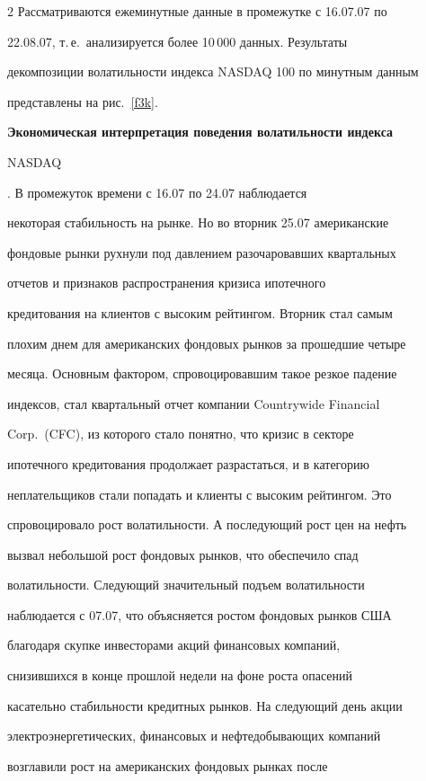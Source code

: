 \begin{multicols}{2}
Рассматриваются ежеминутные данные в промежутке с 16.07.07 по


22.08.07, т.\,е.\ анализируется более 10\,000 данных. Результаты


декомпозиции волатильности индекса NASDAQ 100 по минутным данным


представлены на рис.~\ref{f3k}.





{\bf Экономическая интерпретация поведения волатильности индекса


NASDAQ}. В промежуток вре\-мени с 16.07 по 24.07 наблюдается


некоторая стабильность на рынке. Но во вторник 25.07 американские


фондовые рынки рухнули под давлением разочаровавших квартальных


отчетов и признаков распространения кризиса ипотечного


кредитования на клиентов с высоким рейтингом. Вторник стал самым


плохим днем для американских фондовых рынков за прошедшие четыре


месяца. Основным фактором, спровоцировавшим такое резкое падение


индексов, стал квартальный отчет компании Countrywide Financial


Corp.\ (CFC), из которого стало понятно, что кризис в секторе


ипотечного кредитования продолжает разрастаться, и в категорию


неплательщиков стали попадать и клиенты с высоким рейтингом. Это


спровоцировало рост волатильности. А последующий рост цен на нефть


вызвал небольшой рост фондовых рынков, что обеспечило спад


волатильности. Следующий значительный подъем волатильности


наблюдается с 07.07, что объясняется ростом фондовых рынков США


благодаря скупке инвесторами акций финансовых компаний,


снизившихся в конце прошлой недели на фоне рос\-та опасений


касательно стабильности кредитных рынков. На следующий день акции


электроэнергетических, финансовых и нефтедобывающих компаний


возглавили рост на американских фондовых рынках после



\end{multicols}
